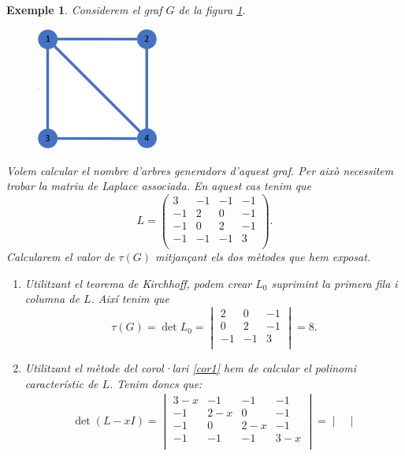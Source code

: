 \documentclass{article}
\newtheorem{example}{Exemple}[section]
\begin{document}
    \begin{example}
       Considerem el graf $G$ de la figura \ref{graf1}.
       \begin{figure}[H]
           \centering
           \includegraphics[width=4cm]{imatges/graf1.jpg}
           \label{graf1}
       \end{figure}
       Volem calcular el nombre d'arbres generadors d'aquest graf. Per això necessitem trobar la matriu de Laplace associada. En aquest cas tenim que $$L=\begin{pmatrix}
       3 & -1 & -1 & -1\\
       -1 & 2 & 0 & -1\\
       -1 & 0 & 2 & -1\\
       -1 & -1 & -1 & 3\\
       \end{pmatrix}.$$
       Calcularem el valor de $\tau(G)$ mitjançant els dos mètodes que hem exposat.
       \begin{enumerate}
           \item Utilitzant el teorema de Kirchhoff, podem crear $L_0$ suprimint la primera fila i columna de $L$. Així tenim que $$\tau(G)=\det L_0=\begin{vmatrix}
            2 & 0 & -1\\
            0 & 2 & -1\\
            -1 & -1 & 3\\
            \end{vmatrix}=8.$$
            \item Utilitzant el mètode del corol·lari \ref{cor1} hem de calcular el polinomi característic de $L$. Tenim doncs que:
            \begin{multline*}
                \det(L-xI)=\begin{vmatrix}
        3-x & -1 & -1 & -1\\
       -1 & 2-x & 0 & -1\\
       -1 & 0 & 2-x & -1\\
       -1 & -1 & -1 & 3-x\\
    \end{vmatrix}=\begin{vmatrix}

\end{vmatrix}
\end{multline*}
\end{enumerate}
\end{example}
\end{document}
